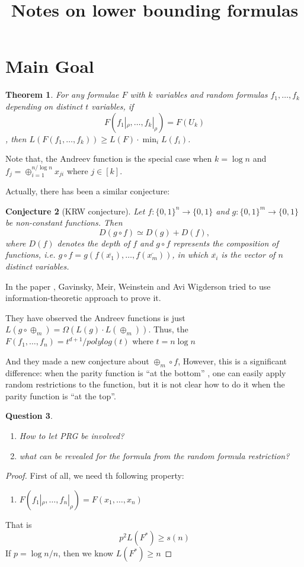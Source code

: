 \documentclass[12pt]{article}
\title{Notes on lower bounding formulas}
\newtheorem{theorem}{Theorem}[section]
\newtheorem{q}[theorem]{Question}
\newtheorem{conjecture}[theorem]{Conjecture}
\renewcommand{\.}{,\ldots,}
\begin{document}
		\maketitle 

\section{Main Goal}
\begin{theorem}
	For any formulae $F$ with $k$ variables and random formulas $f_1\. f_k$ depending on distinct $t$ variables, if $$F(f_1|_\rho\.f_k|_\rho)=F(U_k)$$, then 
	$L(F(f_1\.f_k))\geq L(F)\cdot \min_i L(f_i)$.
\end{theorem}
Note that, the Andreev function is the special case when $k=\log n$ and $f_j=\oplus_{i=1}^{n/\log n} x_{ji}$ where $j\in[k]$. 

Actually, there has been a similar conjecture: 
\begin{conjecture}[KRW conjecture]
Let $f : \{0, 1\}^n\rightarrow \{0, 1\}$ and $g : \{0, 1\}^m \rightarrow \{0, 1\}$ be non-constant functions. Then
$$D(g \circ f) \simeq D(g) + D(f),$$
where $D(f)$ denotes the depth of $f$ and $g\circ f$ represents the composition of functions, i.e. $g\circ f=g(f(\overline{x_1}),\ldots, f(\overline{x_m}))$, in which $\overline{x_i}$ is the vector of $n$ distinct variables. 
\end{conjecture}
In the paper \cite{gavinsky2014toward},  Gavinsky, Meir, Weinstein and Avi Wigderson tried to use information-theoretic approach to prove it.  

They have observed the Andreev functions is just 
$L(g \circ \oplus_m) = \Omega( L(g) \cdot L(\oplus_m)).$
Thus, the $F(f_1\.f_n)=t^{d+1}/polylog (t)$ where $t=n\log n$

And they made a new conjecture about $\oplus_m\circ f$, However, this is a significant difference:
when the parity function is “at the bottom” , one can easily apply random restrictions
to the function, but it is not clear how to do it when the parity function is “at the top”.


\begin{q}
	\begin{enumerate}
		\item How to let PRG be involved?
		\item what can be revealed for the formula from the random formula restriction?
	\end{enumerate}
\end{q}
\begin{proof}
First of all, we need th following property:
\begin{enumerate}
\item $F(f_1|_\rho\.f_n|_\rho)=F(x_1\.x_n)$
\end{enumerate}
That is 
$$p^2L(F^*)\geq s(n)$$
If $p=\log n/n$, then we know $L(F^*)\geq n$
\end{proof}
\end{document}

